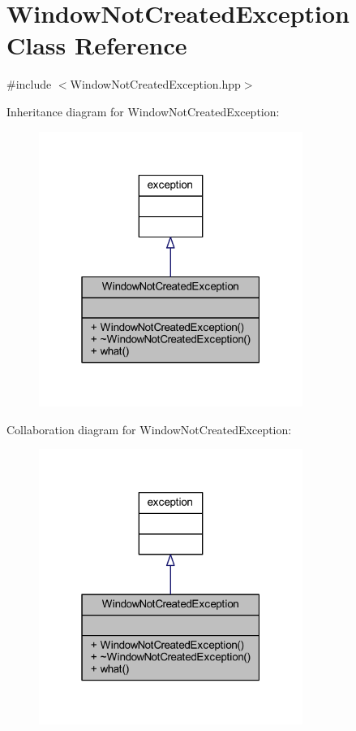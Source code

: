 \hypertarget{class_window_not_created_exception}{}\section{Window\+Not\+Created\+Exception Class Reference}
\label{class_window_not_created_exception}


{\ttfamily \#include $<$Window\+Not\+Created\+Exception.\+hpp$>$}



Inheritance diagram for Window\+Not\+Created\+Exception\+:\nopagebreak
\begin{figure}[H]
\begin{center}
\leavevmode
\includegraphics[width=244pt]{class_window_not_created_exception__inherit__graph}
\end{center}
\end{figure}


Collaboration diagram for Window\+Not\+Created\+Exception\+:\nopagebreak
\begin{figure}[H]
\begin{center}
\leavevmode
\includegraphics[width=244pt]{class_window_not_created_exception__coll__graph}
\end{center}
\end{figure}
